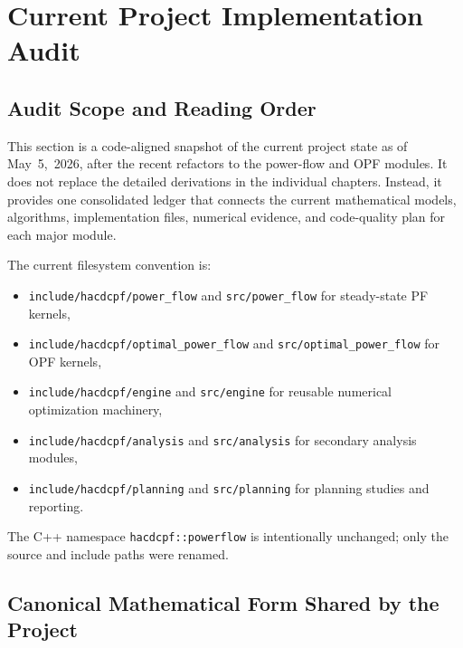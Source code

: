 \section{Current Project Implementation Audit}
\label{sec:current-project-audit}

\subsection{Audit Scope and Reading Order}

This section is a code-aligned snapshot of the current project state as of
May~5,~2026, after the recent refactors to the power-flow and OPF modules.  It
does not replace the detailed derivations in the individual chapters.  Instead,
it provides one consolidated ledger that connects the current mathematical
models, algorithms, implementation files, numerical evidence, and code-quality
plan for each major module.

The current filesystem convention is:
\begin{itemize}
  \item \texttt{include/hacdcpf/power\_flow} and \texttt{src/power\_flow} for steady-state PF kernels,
  \item \texttt{include/hacdcpf/optimal\_power\_flow} and \texttt{src/optimal\_power\_flow} for OPF kernels,
  \item \texttt{include/hacdcpf/engine} and \texttt{src/engine} for reusable numerical optimization machinery,
  \item \texttt{include/hacdcpf/analysis} and \texttt{src/analysis} for secondary analysis modules,
  \item \texttt{include/hacdcpf/planning} and \texttt{src/planning} for planning studies and reporting.
\end{itemize}
The C++ namespace \texttt{hacdcpf::powerflow} is intentionally unchanged; only
the source and include paths were renamed.

\subsection{Canonical Mathematical Form Shared by the Project}

